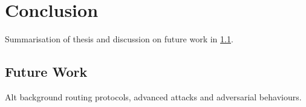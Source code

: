 \chapter{Conclusion}
\label{cha:conc}
Summarisation of thesis and discussion on future work in \cref{sec:Cfuture}.


\section{Future Work}
\label{sec:Cfuture}
Alt background routing protocols, advanced attacks and adversarial behaviours. 


